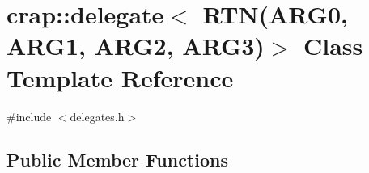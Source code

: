\hypertarget{classcrap_1_1delegate_3_01_r_t_n_07_a_r_g0_00_01_a_r_g1_00_01_a_r_g2_00_01_a_r_g3_08_4}{\section{crap\+:\+:delegate$<$ R\+T\+N(A\+R\+G0, A\+R\+G1, A\+R\+G2, A\+R\+G3)$>$ Class Template Reference}
\label{classcrap_1_1delegate_3_01_r_t_n_07_a_r_g0_00_01_a_r_g1_00_01_a_r_g2_00_01_a_r_g3_08_4}
}


{\ttfamily \#include $<$delegates.\+h$>$}

\subsection*{Public Member Functions}
